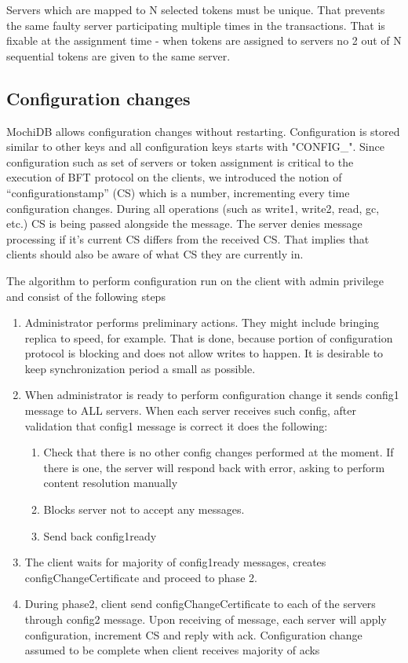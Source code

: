 \documentclass[letterpaper,twocolumn,10pt]{article}
\begin{document}
Servers which are mapped to N selected tokens must be unique. That prevents the same faulty server participating multiple times in the transactions. That is fixable at the assignment time - when tokens are assigned to servers no 2 out of N sequential tokens are given to the same server.

\subsection{Configuration changes}
MochiDB allows configuration changes without restarting. Configuration is stored similar to other keys and all configuration keys starts with "CONFIG\_". Since configuration such as set of servers or token assignment is critical to the execution of BFT protocol on the clients, we introduced the notion of “configurationstamp” (CS) which is a number, incrementing every time configuration changes. During all operations (such as write1, write2, read, gc, etc.) CS is being passed alongside the message. The server denies message processing if it’s current CS differs from the received CS. That implies that clients should also be aware of what CS they are currently in.

The algorithm to perform configuration run on the client with admin privilege and consist of the following steps
\begin{enumerate}
\item Administrator performs preliminary actions. They might include bringing replica to speed, for example. That is done, because portion of configuration protocol is blocking and does not allow writes to happen. It is desirable to keep synchronization period a small as possible.
\item When administrator is ready to perform configuration change it sends config1 message to ALL servers. When each server receives such config, after validation that config1 message is correct it does the following:
 \begin{enumerate}
    \item Check that there is no other config changes performed at the moment. If there is one, the server will respond back with error, asking to perform content resolution manually
    \item Blocks server not to accept any messages.
    \item Send back config1ready
\end{enumerate}
\item The client waits for majority of config1ready messages, creates configChangeCertificate and proceed to phase 2.
\item During phase2, client send configChangeCertificate to each of the servers through config2 message. Upon receiving of message, each server will apply configuration, increment CS and reply with ack.
Configuration change assumed to be complete when client receives majority of acks
\end{enumerate}
\end{document}
